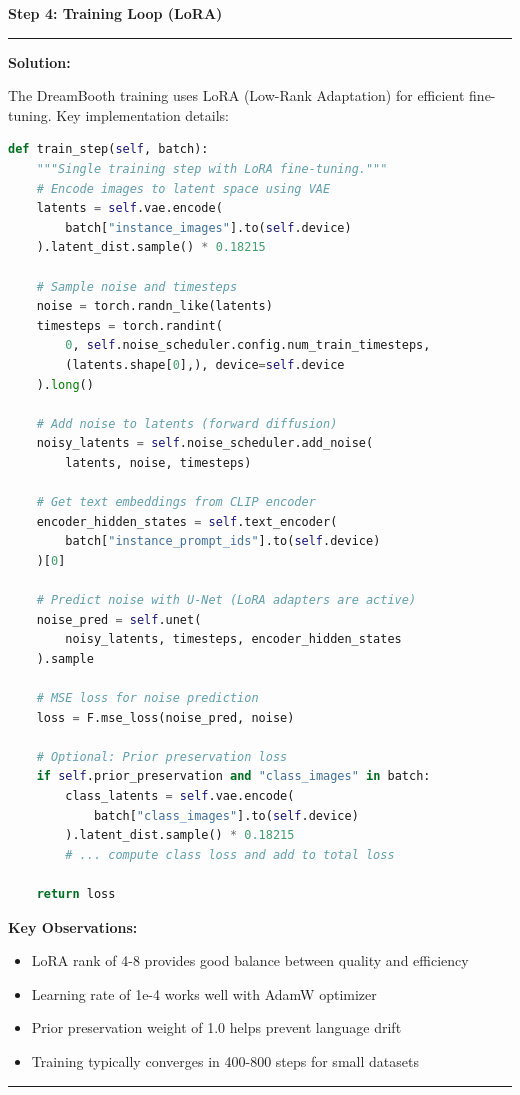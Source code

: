 \documentclass[a4paper,12pt]{article}
\newenvironment{solutionbox}{
    \par
    \vspace{0.5em}
    \noindent
    {\color{primary}\rule{\linewidth}{0.4pt}}
    \par\smallskip
    \noindent\textbf{\color{primary}Solution:}
    \par\smallskip
    \small
}{
    \par\smallskip
    {\color{primary}\rule{\linewidth}{0.4pt}}
    \par\vspace{0.5em}
}
\begin{document}
\textbf{Step 4: Training Loop (LoRA)}
\begin{solutionbox}
    The DreamBooth training uses LoRA (Low-Rank Adaptation) for efficient fine-tuning. Key implementation details:
    
\begin{lstlisting}[language=Python]
def train_step(self, batch):
    """Single training step with LoRA fine-tuning."""
    # Encode images to latent space using VAE
    latents = self.vae.encode(
        batch["instance_images"].to(self.device)
    ).latent_dist.sample() * 0.18215
    
    # Sample noise and timesteps
    noise = torch.randn_like(latents)
    timesteps = torch.randint(
        0, self.noise_scheduler.config.num_train_timesteps,
        (latents.shape[0],), device=self.device
    ).long()
    
    # Add noise to latents (forward diffusion)
    noisy_latents = self.noise_scheduler.add_noise(
        latents, noise, timesteps)
    
    # Get text embeddings from CLIP encoder
    encoder_hidden_states = self.text_encoder(
        batch["instance_prompt_ids"].to(self.device)
    )[0]
    
    # Predict noise with U-Net (LoRA adapters are active)
    noise_pred = self.unet(
        noisy_latents, timesteps, encoder_hidden_states
    ).sample
    
    # MSE loss for noise prediction
    loss = F.mse_loss(noise_pred, noise)
    
    # Optional: Prior preservation loss
    if self.prior_preservation and "class_images" in batch:
        class_latents = self.vae.encode(
            batch["class_images"].to(self.device)
        ).latent_dist.sample() * 0.18215
        # ... compute class loss and add to total loss
    
    return loss
\end{lstlisting}
    
    \textbf{Key Observations:}
    \begin{itemize}
        \item LoRA rank of 4-8 provides good balance between quality and efficiency
        \item Learning rate of 1e-4 works well with AdamW optimizer
        \item Prior preservation weight of 1.0 helps prevent language drift
        \item Training typically converges in 400-800 steps for small datasets
    \end{itemize}
\end{solutionbox}
\end{document}
